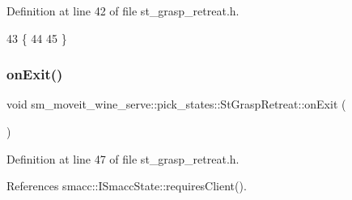 Definition at line 42 of file st\+\_\+grasp\+\_\+retreat.\+h.


\begin{DoxyCode}
43     \{
44         
45     \}
\end{DoxyCode}
\mbox{\label{structsm__moveit__wine__serve_1_1pick__states_1_1StGraspRetreat_a4fe329e46e9a5df3c54cd8fae48facd5}} 
\subsubsection{\texorpdfstring{on\+Exit()}{onExit()}}
{\footnotesize\ttfamily void sm\+\_\+moveit\+\_\+wine\+\_\+serve\+::pick\+\_\+states\+::\+St\+Grasp\+Retreat\+::on\+Exit (\begin{DoxyParamCaption}\item[{\hyperlink{structsmacc_1_1default__transition__tags_1_1SUCCESS}{S\+U\+C\+C\+E\+SS}}]{ }\end{DoxyParamCaption})\hspace{0.3cm}{\ttfamily [inline]}}



Definition at line 47 of file st\+\_\+grasp\+\_\+retreat.\+h.



References smacc\+::\+I\+Smacc\+State\+::requires\+Client().


